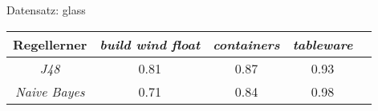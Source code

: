 
Datensatz: glass

\begin{tabular}{c|c|c|c|c}
				Regellerner       & \emph{build wind float} & \emph{containers} & \emph{tableware}  \\ \hline
				\emph{J48}			& 0.81 & 0.87 & 0.93  \\ \hline
				\emph{Naive Bayes}  & 0.71 & 0.84 & 0.98  
\end{tabular}